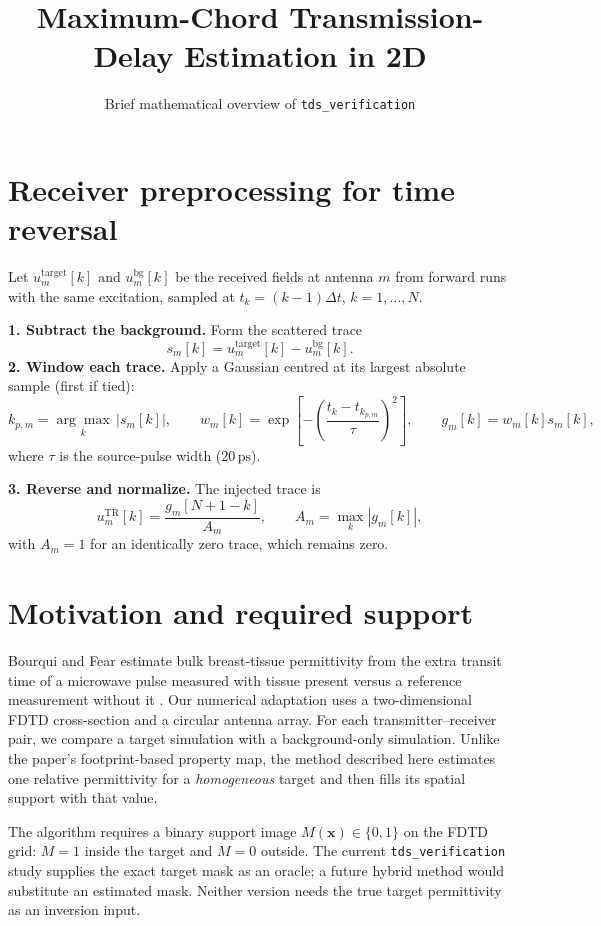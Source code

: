\documentclass[11pt]{article}
\title{Maximum-Chord Transmission-Delay Estimation in 2D}
\author{Brief mathematical overview of \texttt{tds\_verification}}
\date{}
\begin{document}
\maketitle
\vspace{-1.7em}

\section*{Receiver preprocessing for time reversal}
Let $u_m^{\mathrm{target}}[k]$ and $u_m^{\mathrm{bg}}[k]$ be the received fields at antenna $m$ from forward runs with the same excitation, sampled at $t_k=(k-1)\Delta t$, $k=1,\ldots,N$.

\textbf{1. Subtract the background.} Form the scattered trace
\begin{equation}
 s_m[k]=u_m^{\mathrm{target}}[k]-u_m^{\mathrm{bg}}[k].
\end{equation}
\textbf{2. Window each trace.} Apply a Gaussian centred at its largest absolute sample (first if tied):
\begin{equation}
 k_{p,m}=\underset{k}{\arg\max}\,|s_m[k]|,\qquad
 w_m[k]=\exp\!\left[-\left(\frac{t_k-t_{k_{p,m}}}{\tau}\right)^2\right],\qquad
 g_m[k]=w_m[k]s_m[k],
\end{equation}
where $\tau$ is the source-pulse width ($20\,\mathrm{ps}$).

\textbf{3. Reverse and normalize.} The injected trace is
\begin{equation}
 u_m^{\mathrm{TR}}[k]=\frac{g_m[N+1-k]}{A_m},\qquad
 A_m=\max_k|g_m[k]|,
\end{equation}
with $A_m=1$ for an identically zero trace, which remains zero.

\section*{Motivation and required support}
Bourqui and Fear estimate bulk breast-tissue permittivity from the extra transit time of a microwave pulse measured with tissue present versus a reference measurement without it \cite{bourqui2016}. Our numerical adaptation uses a two-dimensional FDTD cross-section and a circular antenna array. For each transmitter--receiver pair, we compare a target simulation with a background-only simulation. Unlike the paper's footprint-based property map, the method described here estimates one relative permittivity for a \emph{homogeneous} target and then fills its spatial support with that value.

The algorithm requires a binary support image $M(\mathbf{x})\in\{0,1\}$ on the FDTD grid: $M=1$ inside the target and $M=0$ outside. The current \texttt{tds\_verification} study supplies the exact target mask as an oracle; a future hybrid method would substitute an estimated mask. Neither version needs the true target permittivity as an inversion input.
\end{document}

